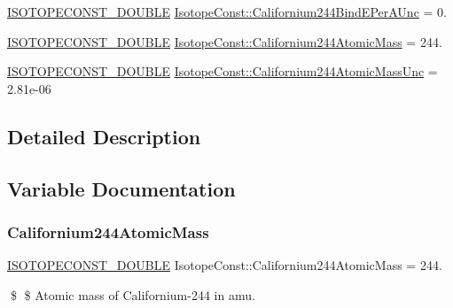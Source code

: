\begin{DoxyCompactItemize}
\item 
\mbox{\hyperlink{group___isotope_const-_macros_ga8f45a7272ce02c0b4c65c44636ed719a}{I\+S\+O\+T\+O\+P\+E\+C\+O\+N\+S\+T\+\_\+\+D\+O\+U\+B\+LE}} \mbox{\hyperlink{group___isotope_const-_californium-_cf244_ga1e5d378193794f4a0b8ccb1d8cf07433}{Isotope\+Const\+::\+Californium244\+Bind\+E\+Per\+A\+Unc}} = 0.
\item 
\mbox{\hyperlink{group___isotope_const-_macros_ga8f45a7272ce02c0b4c65c44636ed719a}{I\+S\+O\+T\+O\+P\+E\+C\+O\+N\+S\+T\+\_\+\+D\+O\+U\+B\+LE}} \mbox{\hyperlink{group___isotope_const-_californium-_cf244_ga737022bd2d58fc52a4abc4473681ba3a}{Isotope\+Const\+::\+Californium244\+Atomic\+Mass}} = 244.
\item 
\mbox{\hyperlink{group___isotope_const-_macros_ga8f45a7272ce02c0b4c65c44636ed719a}{I\+S\+O\+T\+O\+P\+E\+C\+O\+N\+S\+T\+\_\+\+D\+O\+U\+B\+LE}} \mbox{\hyperlink{group___isotope_const-_californium-_cf244_ga8cdd487784451eeeca1f85b10d7bd4d1}{Isotope\+Const\+::\+Californium244\+Atomic\+Mass\+Unc}} = 2.\+81e-\/06
\end{DoxyCompactItemize}


\subsection{Detailed Description}


\subsection{Variable Documentation}
\mbox{\label{group___isotope_const-_californium-_cf244_ga737022bd2d58fc52a4abc4473681ba3a}} 
\subsubsection{\texorpdfstring{Californium244\+Atomic\+Mass}{Californium244AtomicMass}}
{\footnotesize\ttfamily \mbox{\hyperlink{group___isotope_const-_macros_ga8f45a7272ce02c0b4c65c44636ed719a}{I\+S\+O\+T\+O\+P\+E\+C\+O\+N\+S\+T\+\_\+\+D\+O\+U\+B\+LE}} Isotope\+Const\+::\+Californium244\+Atomic\+Mass = 244.}

\$ \$ Atomic mass of Californium-\/244 in amu. \mbox{\label{group___isotope_const-_californium-_cf244_ga8cdd487784451eeeca1f85b10d7bd4d1}} 
